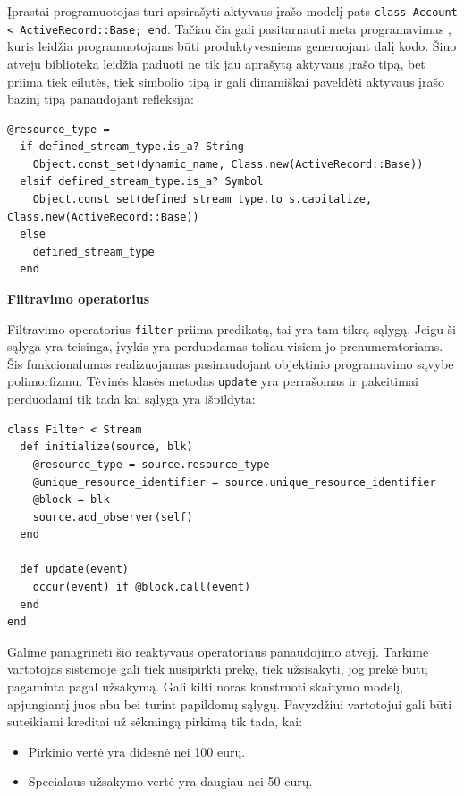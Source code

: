 Įprastai programuotojas turi apsirašyti aktyvaus įrašo modelį pats \lstinline|class Account < ActiveRecord::Base; end|. Tačiau čia gali pasitarnauti meta programavimas \cite{Olsen:2007:DPR:1349728}, kuris leidžia programuotojams būti produktyvesniems generuojant dalį kodo. Šiuo atveju biblioteka leidžia paduoti ne tik jau aprašytą aktyvaus įrašo tipą, bet priima tiek eilutės, tiek simbolio tipą ir gali dinamiškai paveldėti aktyvaus įrašo bazinį tipą panaudojant refleksija:

\begin{lstlisting}
@resource_type =
  if defined_stream_type.is_a? String
    Object.const_set(dynamic_name, Class.new(ActiveRecord::Base))
  elsif defined_stream_type.is_a? Symbol
    Object.const_set(defined_stream_type.to_s.capitalize, Class.new(ActiveRecord::Base))
  else
    defined_stream_type
  end
\end{lstlisting}

\textbf{Filtravimo operatorius}

Filtravimo operatorius \lstinline|filter| priima predikatą, tai yra tam tikrą sąlygą. Jeigu ši sąlyga yra teisinga, įvykis yra perduodamas toliau visiem jo prenumeratoriams. Šis funkcionalumas realizuojamas pasinaudojant objektinio programavimo sąvybe polimorfizmu. Tėvinės klasės metodas \lstinline|update| yra perrašomas ir pakeitimai perduodami tik tada kai sąlyga yra išpildyta:

\begin{lstlisting}
class Filter < Stream
  def initialize(source, blk)
    @resource_type = source.resource_type
    @unique_resource_identifier = source.unique_resource_identifier
    @block = blk
    source.add_observer(self)
  end

  def update(event)
    occur(event) if @block.call(event)
  end
end
\end{lstlisting}

Galime panagrinėti šio reaktyvaus operatoriaus panaudojimo atvejį. Tarkime vartotojas sistemoje gali tiek nusipirkti prekę, tiek užsisakyti, jog prekė būtų pagaminta pagal užsakymą. Gali kilti noras konstruoti skaitymo modelį, apjungiantį juos abu bei turint papildomų sąlygų. Pavyzdžiui vartotojui gali būti suteikiami kreditai už sėkmingą pirkimą tik tada, kai:

\begin{itemize}
  \item Pirkinio vertė yra didesnė nei 100 eurų.
  \item Specialaus užsakymo vertė yra daugiau nei 50 eurų.
\end{itemize}

